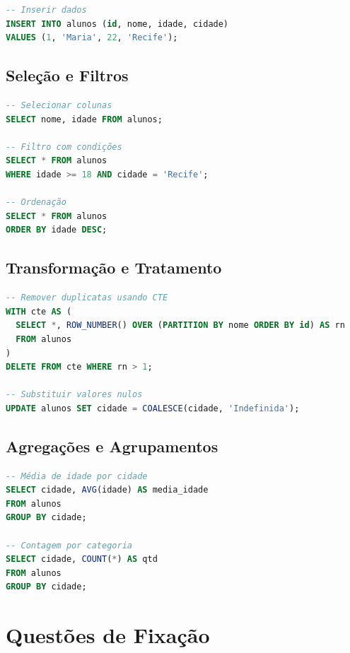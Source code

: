 \begin{appendices}
\begin{lstlisting}[language=SQL,caption={Criar e importar tabelas}]
-- Inserir dados
INSERT INTO alunos (id, nome, idade, cidade)
VALUES (1, 'Maria', 22, 'Recife');
\end{lstlisting}

\subsection*{Seleção e Filtros}
\begin{lstlisting}[language=SQL,caption={Consultas básicas}]
-- Selecionar colunas
SELECT nome, idade FROM alunos;

-- Filtro com condições
SELECT * FROM alunos
WHERE idade >= 18 AND cidade = 'Recife';

-- Ordenação
SELECT * FROM alunos
ORDER BY idade DESC;
\end{lstlisting}

\subsection*{Transformação e Tratamento}
\begin{lstlisting}[language=SQL,caption={Limpeza e transformação}]
-- Remover duplicatas usando CTE
WITH cte AS (
  SELECT *, ROW_NUMBER() OVER (PARTITION BY nome ORDER BY id) AS rn
  FROM alunos
)
DELETE FROM cte WHERE rn > 1;

-- Substituir valores nulos
UPDATE alunos SET cidade = COALESCE(cidade, 'Indefinida');
\end{lstlisting}

\subsection*{Agregações e Agrupamentos}
\begin{lstlisting}[language=SQL,caption={Estatísticas descritivas}]
-- Média de idade por cidade
SELECT cidade, AVG(idade) AS media_idade
FROM alunos
GROUP BY cidade;

-- Contagem por categoria
SELECT cidade, COUNT(*) AS qtd
FROM alunos
GROUP BY cidade;
\end{lstlisting}
\end{appendices}

\section*{Questões de Fixação}

